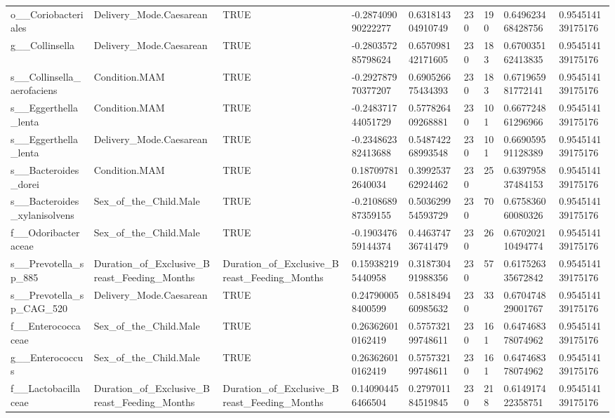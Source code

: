 \begin{longtable}{lllllllll}
o\_\_Coriobacteriales & Delivery\_Mode.Caesarean & TRUE & -0.287409090222277 & 0.631814304910749 & 230 & 190 & 0.649623468428756 & 0.954514139175176 \\
g\_\_Collinsella & Delivery\_Mode.Caesarean & TRUE & -0.280357285798624 & 0.657098142171605 & 230 & 183 & 0.670035162413835 & 0.954514139175176 \\
s\_\_Collinsella\_aerofaciens & Condition.MAM & TRUE & -0.292787970377207 & 0.690526675434393 & 230 & 183 & 0.671965981772141 & 0.954514139175176 \\
s\_\_Eggerthella\_lenta & Condition.MAM & TRUE & -0.248371744051729 & 0.577826409268881 & 230 & 101 & 0.667724861296966 & 0.954514139175176 \\
s\_\_Eggerthella\_lenta & Delivery\_Mode.Caesarean & TRUE & -0.234862382413688 & 0.548742268993548 & 230 & 101 & 0.669059591128389 & 0.954514139175176 \\
s\_\_Bacteroides\_dorei & Condition.MAM & TRUE & 0.187097812640034 & 0.399253762924462 & 230 & 25 & 0.639795837484153 & 0.954514139175176 \\
s\_\_Bacteroides\_xylanisolvens & Sex\_of\_the\_Child.Male & TRUE & -0.210868987359155 & 0.503629954593729 & 230 & 70 & 0.675836060080326 & 0.954514139175176 \\
f\_\_Odoribacteraceae & Sex\_of\_the\_Child.Male & TRUE & -0.190347659144374 & 0.446374736741479 & 230 & 26 & 0.670202110494774 & 0.954514139175176 \\
s\_\_Prevotella\_sp\_885 & Duration\_of\_Exclusive\_Breast\_Feeding\_Months & Duration\_of\_Exclusive\_Breast\_Feeding\_Months & 0.159382195440958 & 0.318730491988356 & 230 & 57 & 0.617526335672842 & 0.954514139175176 \\
s\_\_Prevotella\_sp\_CAG\_520 & Delivery\_Mode.Caesarean & TRUE & 0.247900058400599 & 0.581849460985632 & 230 & 33 & 0.670474829001767 & 0.954514139175176 \\
f\_\_Enterococcaceae & Sex\_of\_the\_Child.Male & TRUE & 0.263626010162419 & 0.575732199748611 & 230 & 161 & 0.647468378074962 & 0.954514139175176 \\
g\_\_Enterococcus & Sex\_of\_the\_Child.Male & TRUE & 0.263626010162419 & 0.575732199748611 & 230 & 161 & 0.647468378074962 & 0.954514139175176 \\
f\_\_Lactobacillaceae & Duration\_of\_Exclusive\_Breast\_Feeding\_Months & Duration\_of\_Exclusive\_Breast\_Feeding\_Months & 0.140904456466504 & 0.279701184519845 & 230 & 218 & 0.614917422358751 & 0.954514139175176 \\

\end{longtable}
